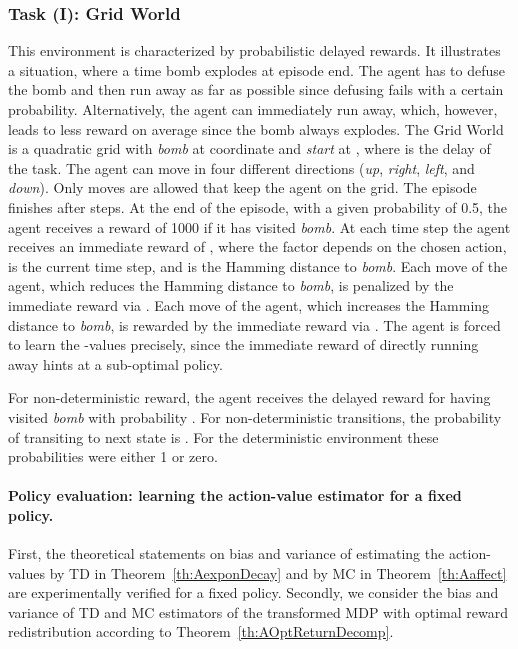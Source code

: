 \documentclass{article}
\begin{document}
\begin{appendices}
\subsubsection{Task (I): Grid World}
\label{sec:AGW}
This environment is characterized by probabilistic delayed rewards.
It illustrates a situation, where a time bomb
explodes at episode end.
The agent has to defuse the bomb
and then run away as far as possible since
defusing fails with a certain probability.
Alternatively, the agent can immediately run away, 
which, however, leads to less reward on average 
since the bomb always explodes.
The Grid World is a quadratic  grid with
{\em bomb} at coordinate  and
{\em start} at , where  is the delay of the task.
The agent can move in four different directions 
({\em up}, {\em right}, {\em left}, and {\em down}).
Only moves are allowed that keep the agent on the grid. 
The episode finishes after  steps.
At the end of the episode, 
with a given probability of 0.5, the agent receives a reward of 1000
if it has visited {\em bomb}.
At each time step the agent receives 
an immediate reward of , 
where the factor  depends on the chosen action, 
 is the current time step, and  is the Hamming distance to {\em bomb}.
Each move of the agent, which reduces the Hamming distance to {\em bomb}, 
is penalized by the immediate reward via . 
Each move of the agent, which increases the Hamming distance to {\em bomb}, 
is rewarded by the immediate reward via .
The agent is forced to learn the -values precisely,
since the immediate reward of directly running away hints at a sub-optimal policy.

For non-deterministic reward, the agent receives the delayed reward for
having visited {\em bomb} with probability . 
For non-deterministic transitions, the probability of transiting to next state  
is . 
For the deterministic environment these probabilities were either 1 or zero. 


\paragraph{Policy evaluation: learning the action-value estimator for a fixed policy.} 
First, the theoretical statements on bias and variance of 
estimating the action-values by TD in Theorem~\ref{th:AexponDecay} and 
by MC in Theorem~\ref{th:Aaffect} are experimentally verified for a fixed policy.
Secondly, we consider the bias and variance of TD and MC estimators 
of the transformed MDP with optimal reward redistribution according to Theorem~\ref{th:AOptReturnDecomp}.


\end{appendices}
\end{document}
